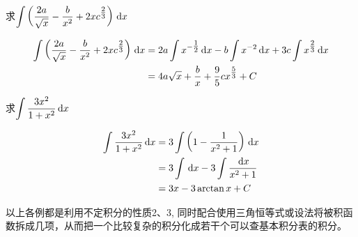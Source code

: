 \begin{example}
求$\displaystyle\int \left(\dfrac{2a}{\sqrt{x}}-\dfrac{b}{x^2}+2xc^{\tfrac{2}{3}}\right)\,{\rm d} x$
\end{example}


\begin{solution}
    \[\begin{split}
        \displaystyle\int \left(\dfrac{2a}{\sqrt{x}}-\dfrac{b}{x^2}+2xc^{\tfrac{2}{3}}\right)\,{\rm d} x&=2a\int x^{-\tfrac{1}{2}}\,{\rm d} x-b\int x^{-2}\,{\rm d} x+3c\int x^{\tfrac{2}{3}}\,{\rm d} x\\
        &=4a\sqrt{x}+\dfrac{b}{x}+\dfrac{9}{5}cx^{\tfrac{5}{3}}+C
    \end{split}\]
\end{solution}

\begin{example}
    求$\displaystyle\int \dfrac{3x^2}{1+x^2}\,{\rm d} x$
\end{example}

\begin{solution}
\[\begin{split}
    \displaystyle\int \dfrac{3x^2}{1+x^2}\,{\rm d} x&=3\int \left(1-\dfrac{1}{x^2+1}\right)\,{\rm d} x\\
    &=3\int \,{\rm d} x-3\int \dfrac{\,{\rm d} x}{x^2+1}\\
    &=3x-3\arctan x+C
\end{split}\]
\end{solution}

以上各例都是利用不定积分的性质2、3, 同时配合使用三角恒等式或设法将被积函数拆成几项，从而把一个比较复杂的积分化成若干个可以查基本积分表的积分。

